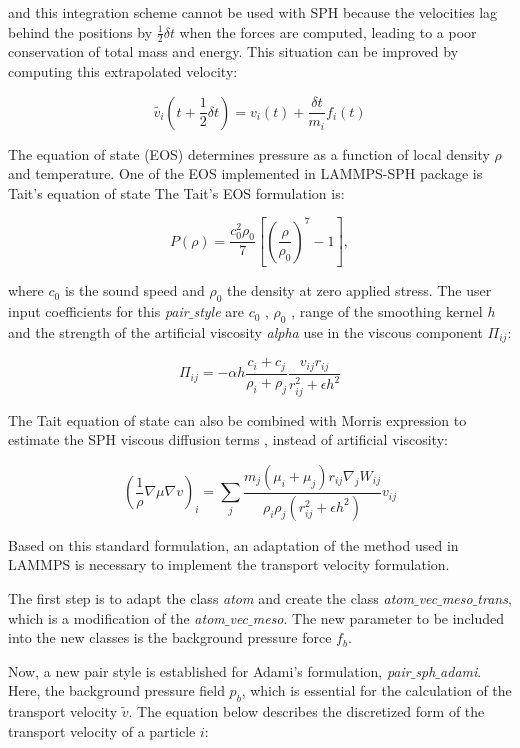 and this integration scheme cannot be used with SPH because the velocities lag behind the positions by $\frac{1}{2}\delta t$ when the forces are computed, leading to a poor conservation
of total mass and energy. This situation can be improved by computing this extrapolated velocity:
  
\begin{equation}
\tilde {v_{i}}(t+\frac{1}{2}\delta t) = v_{i}(t) + \frac{\delta t}{m_{i}} f_{i}(t)
\end{equation}

The equation of state (EOS) determines pressure as a function of local density $\rho$ and temperature. One of the EOS implemented in LAMMPS-SPH package is Tait's equation of state
The Tait's EOS formulation is:

  
\begin{equation}
P(\rho) = \frac{c_{0}^2 \rho_{0}}{7}\left[\left(\frac{\rho}{\rho_{0}}\right)^7 - 1 \right] , 
\end{equation}

where $c_{0}$ is the sound speed and $\rho_{0}$ the density at zero applied stress. The user input coefficients for this \textit{pair$\_$style} are $c_{0}$ , $\rho_{0}$ , range of the
smoothing  kernel $h$ and the strength of the artificial viscosity \textit{alpha} use in the viscous component $\Pi_{ij}$:

\begin{equation}
\Pi_{ij} = -\alpha h \frac{c_{i}+c_{j}}{\rho_{i}+\rho_{j}} \frac{v_{ij}r_{ij}}{r^2_{ij}+\epsilon h^2}
\end{equation}

The Tait equation of state can also be combined with Morris expression to estimate the SPH viscous diffusion terms \cite{morris_switch_1997}, instead of artificial viscosity:

\begin{equation}
\left(\frac{1}{\rho}\nabla  \mu \nabla v \right)_{i} = \sum_{j} \frac{m_{j}(\mu_{i}+\mu_{j})r_{ij}\nabla_{j}W_{ij}}{\rho_{i}\rho_{j}(r^2_{ij}+\epsilon h^2)} v_{ij}
\end{equation}

Based on this standard formulation, an adaptation of the method used in LAMMPS is necessary to implement the transport velocity formulation.\par

The first step is to adapt the class \textit{atom} and create the class \textit{atom$\_$vec$\_$meso$\_$trans}, which is a modification of the \textit{atom$\_$vec$\_$meso}. The new 
parameter to be included into the new classes is the background pressure force $f_{b}$. \par
Now, a new pair style is established for Adami's formulation, \textit{pair$\_$sph$\_$adami}. Here, the background pressure field $p_{b}$, which is essential for the calculation
of the transport velocity $\tilde{v}$. The equation below describes the discretized form of the transport velocity of a particle $i$:

